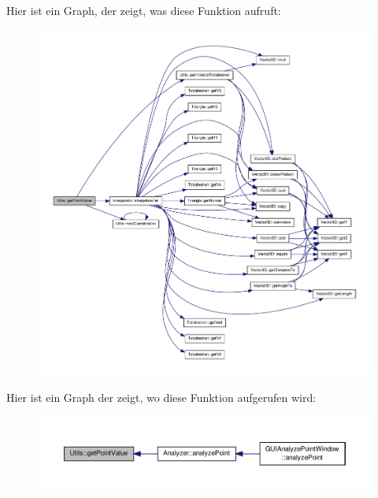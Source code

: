 Hier ist ein Graph, der zeigt, was diese Funktion aufruft\-:
\nopagebreak
\begin{figure}[H]
\begin{center}
\leavevmode
\includegraphics[width=350pt]{namespaceUtils_a6a0ae18a42e2d206bc1b43da27820fe2_cgraph}
\end{center}
\end{figure}




Hier ist ein Graph der zeigt, wo diese Funktion aufgerufen wird\-:
\nopagebreak
\begin{figure}[H]
\begin{center}
\leavevmode
\includegraphics[width=350pt]{namespaceUtils_a6a0ae18a42e2d206bc1b43da27820fe2_icgraph}
\end{center}
\end{figure}



